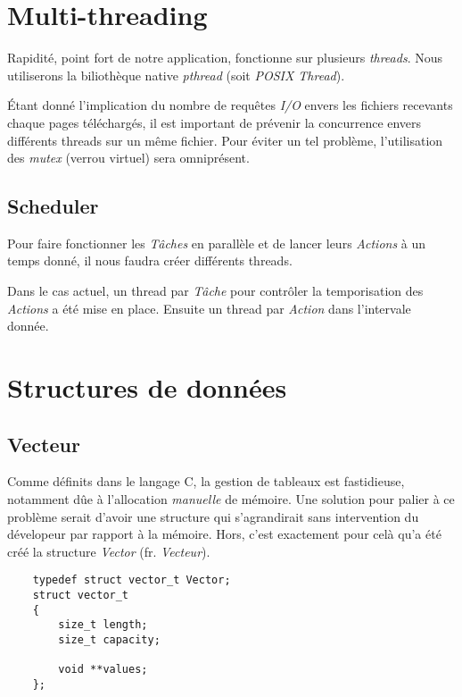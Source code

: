 \documentclass[conference]{IEEEtran}
\begin{document}
\section{Multi-threading}

Rapidité, point fort de notre application, fonctionne sur plusieurs \textit{threads}.
Nous utiliserons la biliothèque native \textit{pthread} (soit \textit{POSIX Thread}).

Étant donné l'implication du nombre de requêtes \textit{I/O} envers les fichiers recevants chaque pages téléchargés, il est important de prévenir la concurrence envers différents threads sur un même fichier.
Pour éviter un tel problème, l'utilisation des \textit{mutex} (verrou virtuel) sera omniprésent.

\subsection{Scheduler}

Pour faire fonctionner les \textit{Tâches} en parallèle et de lancer leurs \textit{Actions} à un temps donné, il nous faudra créer différents threads.

Dans le cas actuel, un thread par \textit{Tâche} pour contrôler la temporisation des \textit{Actions} a été mise en place.
Ensuite un thread par \textit{Action} dans l'intervale donnée.


\section{Structures de données}

\subsection{Vecteur}

Comme définits dans le langage C, la gestion de tableaux est fastidieuse, notamment dûe à l'allocation \textit{manuelle} de mémoire.
Une solution pour palier à ce problème serait d'avoir une structure qui s'agrandirait sans intervention du dévelopeur par rapport à la mémoire.
Hors, c'est exactement pour celà qu'a été créé la structure \textit{Vector} (fr. \textit{Vecteur}).

\begin{lstlisting}
    typedef struct vector_t Vector;
    struct vector_t
    {
        size_t length;
        size_t capacity;

        void **values;
    };
\end{lstlisting}
\end{document}

